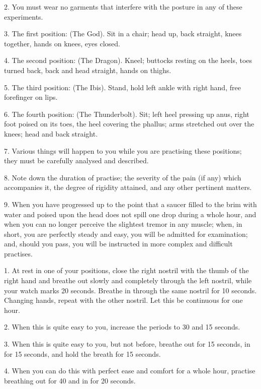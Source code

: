2. You must wear no garments that interfere with the posture in any of these experiments.

3. The first position: (The God). Sit in a chair; head up, back straight, knees together, hands on knees, eyes closed.

4. The second position: (The Dragon). Kneel; buttocks resting on the heels, toes turned back, back and head straight, hands on thighs.

5. The third position: (The Ibis). Stand, hold left ankle with right hand, free forefinger on lips.

6. The fourth position: (The Thunderbolt). Sit; left heel pressing up anus, right foot poised on its toes, the heel covering the phallus; arms stretched out over the knees; head and back straight.

7. Various things will happen to you while you are practising these positions; they must be carefully analysed and described.

8. Note down the duration of practise; the severity of the pain (if any) which accompanies it, the degree of rigidity attained, and any other pertinent matters.

9. When you have progressed up to the point that a saucer filled to the brim with water and poised upon the head does not spill one drop during a whole hour, and when you can no longer perceive the slightest tremor in any muscle; when, in short, you are perfectly steady and easy, you will be admitted for examination; and, should you pass, you will be instructed in more complex and difficult practises.



1. At rest in one of your positions, close the right nostril with the thumb of the right hand and breathe out slowly and completely through the left nostril, while your watch marks 20 seconds. Breathe in through the same nostril for 10 seconds. Changing hands, repeat with the other nostril. Let this be continuous for one hour.

2. When this is quite easy to you, increase the periods to 30 and 15 seconds.

3. When this is quite easy to you, but not before, breathe out for 15 seconds, in for 15 seconds, and hold the breath for 15 seconds.

4. When you can do this with perfect ease and comfort for a whole hour, practise breathing out for 40 and in for 20 seconds.

